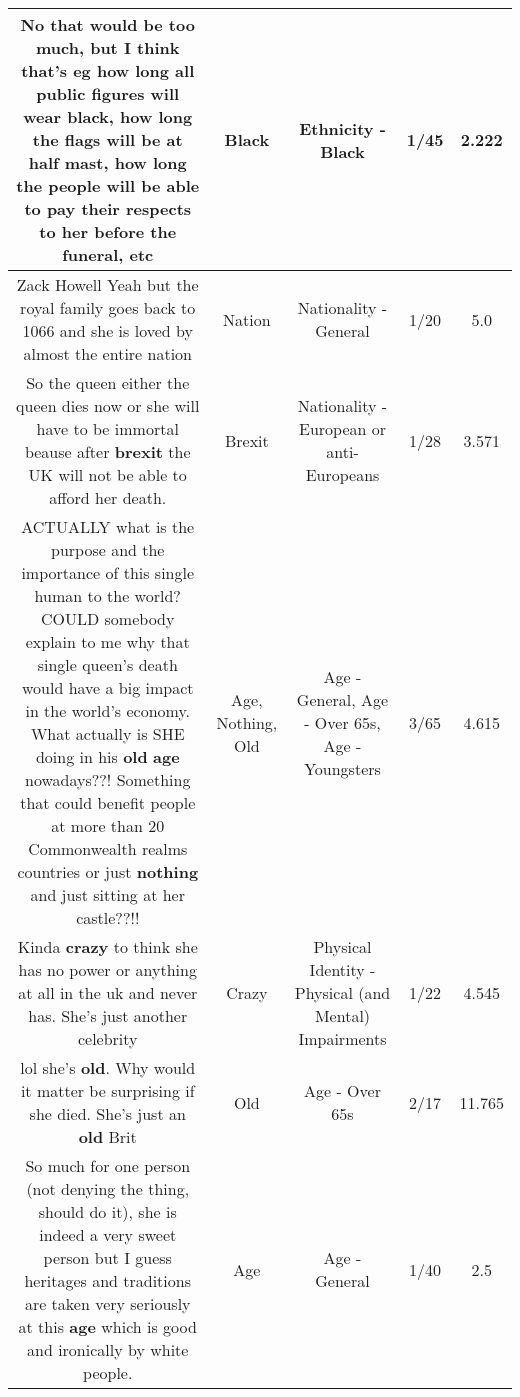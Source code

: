 \documentclass[11pt]{article}
\newlength\mylength
\begin{document}
\begin{center}
\begin{longtable}{|C{.65\mylength}|C{.30\mylength}|C{.12\mylength}|C{.12\mylength}|C{.12\mylength}|}
  \small No that would be too much, but I think that's eg how long all public figures will wear \textbf{black}, how long the flags will be at half mast, how long the people will be able to pay their respects to her before the funeral, etc\normalsize   & Black & Ethnicity - Black & 1/45 & 2.222 \\  \hline
  \small Zack Howell Yeah but the royal family goes back to 1066 and she is loved by almost the entire nation\normalsize   & Nation & Nationality - General & 1/20 & 5.0 \\  \hline
  \small So the queen either the queen dies now or she will have to be immortal beause after \textbf{brexit} the UK will not be able to afford her death.\normalsize   & Brexit & Nationality - European or anti-Europeans & 1/28 & 3.571 \\  \hline
  \small ACTUALLY what is the purpose and the importance of this single human to the world? COULD somebody explain to me why that single queen's death would have a big impact in the world's economy. What actually is SHE doing in his \textbf{old} \textbf{age} nowadays??! Something that could benefit people at more than 20 Commonwealth realms countries or just \textbf{nothing} and just sitting at her castle??!!\normalsize   & Age, Nothing, Old & Age - General, Age - Over 65s, Age - Youngsters & 3/65 & 4.615 \\  \hline
  \small Kinda \textbf{crazy} to think she has no power or anything at all in the uk and never has. She's just another celebrity\normalsize   & Crazy & Physical Identity - Physical (and Mental) Impairments & 1/22 & 4.545 \\  \hline
  \small lol she's \textbf{old}. Why would it matter be surprising if she died. She's just an \textbf{old} Brit\normalsize   & Old & Age - Over 65s & 2/17 & 11.765 \\  \hline
  \small So much for one person (not denying the thing, should do it), she is indeed a very sweet person but I guess heritages and traditions are taken very seriously at this \textbf{age} which is good and ironically by white people.\normalsize   & Age & Age - General & 1/40 & 2.5 \\  \hline

\end{longtable}
\end{center}
\end{document}
